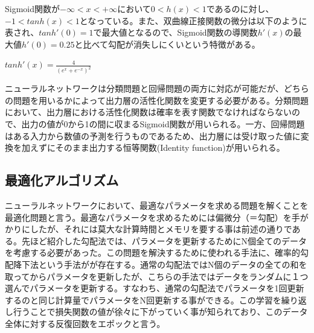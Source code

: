 \documentclass{article}
\begin{document}
Sigmoid関数が\begin{math}-\infty<x<+\infty\end{math}において\begin{math}0<h(x)<1\end{math}であるのに対し、\begin{math}-1<tanh(x)<1\end{math}となっている。また、双曲線正接関数の微分は以下のように表され、\begin{math}tanh'(0)=1\end{math}で最大値となるので、Sigmoid関数の導関数\begin{math}h'(x)\end{math}の最大値\begin{math}h'(0)=0.25\end{math}と比べて勾配が消失しにくいという特徴がある。

\begin{center}
\begin{math}
tanh'(x) =  \frac{4} {(e^x+e^{-x})^{2}} 
\end{math}
\end{center}

ニューラルネットワークは分類問題と回帰問題の両方に対応が可能だが、どちらの問題を用いるかによって出力層の活性化関数を変更する必要がある。分類問題において、出力層における活性化関数は確率を表す関数でなければならないので、出力の値が0から1の間に収まるSigmoid関数が用いられる。一方、回帰問題はある入力から数値の予測を行うものであるため、出力層には受け取った値に変換を加えずにそのまま出力する恒等関数(Identity function)が用いられる。


\subsection{最適化アルゴリズム}

ニューラルネットワークにおいて、最適なパラメータを求める問題を解くことを最適化問題と言う。最適なパラメータを求めるためには偏微分（＝勾配）を手がかりにしたが、それには莫大な計算時間とメモリを要する事は前述の通りである。先ほど紹介した勾配法では、パラメータを更新するためにN個全てのデータを考慮する必要があった。この問題を解決するために使われる手法に、確率的勾配降下法という手法がが存在する。通常の勾配法ではN個のデータの全ての和を取ってからパラメータを更新したが、こちらの手法ではデータをランダムに１つ選んでパラメータを更新する。すなわち、通常の勾配法でパラメータを1回更新するのと同じ計算量でパラメータをN回更新する事ができる。この学習を繰り返し行うことで損失関数の値が徐々に下がっていく事が知られており、このデータ全体に対する反復回数をエポックと言う。
\end{document}
